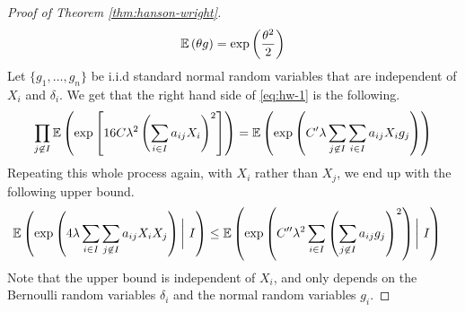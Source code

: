 \documentclass[11pt]{article}
\begin{document}
\begin{proof}[Proof of Theorem \ref{thm:hanson-wright}]
  \begin{align*}
    \mathbb{E}\left( \theta g \right) = \exp\left( \frac{\theta^2}{2} \right)
  \end{align*}
  Let $\{g_1, \ldots, g_n\}$ be i.i.d standard normal random variables that are independent of $X_{i}$ and $\delta_i$.
  We get that the right hand side of \eqref{eq:hw-1} is the following.
  \begin{align*}
    \prod_{j \not \in I} \mathbb{E} \left( \exp\left[ 16 C \lambda^2 \left( \sum_{i \in I} a_{ij} X_i \right)^2 \right] \right)
    = \mathbb{E} \left( \exp\left( C^{\prime}\lambda \sum_{j \not \in I} \sum_{i \in I} a_{ij} X_i g_j \right) \right)
  \end{align*}
  Repeating this whole process again, with $X_i$ rather than $X_j$, we end up with the following upper bound.
  \begin{align*}
    \mathbb{E} \left( \exp\left( 4\lambda \sum_{i \in I} \sum_{j \not \in I} a_{ij} X_i X_j \right) \bigg|\ I \right)
    &\leq \mathbb{E}\left( \exp\left( C^{\prime \prime} \lambda^2 \sum_{i \in I} \left( \sum_{j \not \in I} a_{ij} g_j \right)^2 \right) \bigg|\ I \right)
  \end{align*}
  Note that the upper bound is independent of $X_i$, and only depends on the Bernoulli random variables $\delta_i$ and the normal random variables $g_i$.


\end{proof}
\end{document}
